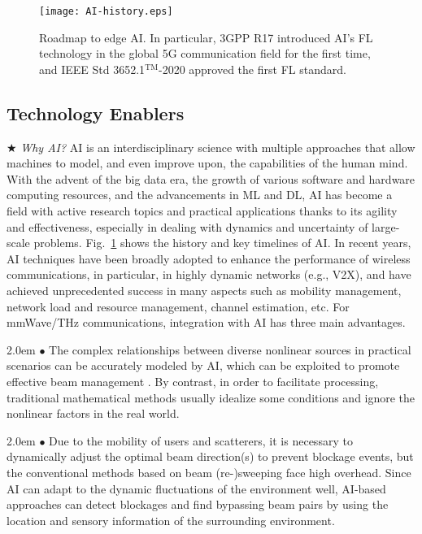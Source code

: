 \documentclass[journal,comsoc]{IEEEtran}
\begin{document}
\begin{figure}[t]
	\centering
	\texttt{[image: AI-history.eps]}
	\caption{Roadmap to edge AI. In particular, 3GPP R17 introduced AI's FL technology in the global 5G communication field for the first time, and IEEE Std 3652.1$^{\text{TM}}$-2020 \cite{IEEE-Guide-FL} approved the first FL standard.}
	\label{fig:AI-history}
\end{figure}


\subsection{Technology Enablers}
$\bigstar$ \emph{Why AI?} AI is an interdisciplinary science with multiple approaches that allow machines to model, and even improve upon, the capabilities of the human mind. With the advent of the big data era, the growth of various software and hardware computing resources, and the advancements in ML and DL, AI has become a field with active research topics and practical applications thanks to its agility and effectiveness, especially in dealing with dynamics and uncertainty of large-scale problems. Fig.~\ref{fig:AI-history} shows the history and key timelines of AI. In recent years, AI techniques have been broadly adopted to enhance the performance of wireless communications, in particular, in highly dynamic networks (e.g., V2X), and have achieved unprecedented success in many aspects such as mobility management, network load and resource management, channel estimation, etc. For mmWave/THz communications, integration with AI has three main advantages.

\hangindent 2.0em
$\bullet$ The complex relationships between diverse nonlinear sources in practical scenarios can be accurately modeled by AI, which can be exploited to promote effective beam management \cite{Deep-Learning-Beam-Management-Arxiv-2021}. By contrast, in order to facilitate processing, traditional mathematical methods usually idealize some conditions and ignore the nonlinear factors in the real world.

\hangindent 2.0em
$\bullet$ Due to the mobility of users and scatterers, it is necessary to dynamically adjust the optimal beam direction(s) to prevent blockage events, but the conventional methods based on beam (re-)sweeping face high overhead. Since AI can adapt to the dynamic fluctuations of the environment well, AI-based approaches can detect blockages and find bypassing beam pairs by using the location and sensory information of the surrounding environment.
\end{document}
